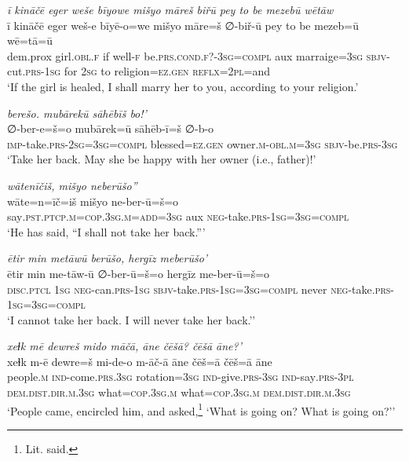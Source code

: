 \ea \label{ZP.100}
\textit{ī kināčē eger weše bīyowe mišyo māreš biřū pey to be mezebū wētāw} \\ 
\gll ī kināčē eger weš-e bīyē-o=we mišyo māre=š ∅-biř-ū pey to be mezeb=ū wē=tā=ū \\ 
 dem.prox girl\textsc{.obl}\textsc{.f} if well\textsc{-f} be\textsc{.prs}.\textsc{cond}\textsc{.f}?\textsc{-3sg}\textsc{=compl} aux marraige\textsc{=3sg} \textsc{sbjv-}cut\textsc{.prs}\textsc{-\textsc{1sg}} for \textsc{2sg} to religion\textsc{\textsc{=ez.gen}} \textsc{reflx}=\textsc{2pl}=and \\ 
\glt `If the girl is healed, I shall marry her to you, according to your religion.'
\z 
 
\ea \label{ZP.106}
\textit{berešo. mubārekū sāhēbīš bo!’} \\ 
\gll ∅-ber-e=š=o mubārek=ū sāhēb-ī=š ∅-b-o \\ 
 \textsc{imp-}take\textsc{.prs}-\textsc{2sg}\textsc{=3sg}\textsc{=compl} blessed\textsc{\textsc{=ez.gen}} owner\textsc{.m}\textsc{-obl}\textsc{.m}\textsc{=3sg} \textsc{sbjv-}be\textsc{.prs}\textsc{-3sg} \\ 
\glt `Take her back. May she be happy with her owner (i.e., father)!'
\z 
 
\ea \label{ZP.108}
\textit{wātenīčiš, mišyo neberūšo”} \\ 
\gll wāte=n=īč=iš mišyo ne-ber-ū=š=o \\ 
 say\textsc{.pst}\textsc{.ptcp}\textsc{.m}\textsc{=cop}\textsc{.3sg}\textsc{.m}\textsc{=add}\textsc{=3sg} aux \textsc{neg-}take\textsc{.prs}\textsc{-\textsc{1sg}}\textsc{=3sg}\textsc{=compl} \\ 
\glt `He has said, “I shall not take her back.”'
\z 
 
\ea \label{ZP.109}
\textit{ētir min metāwū berūšo, hergīz meberūšo’} \\ 
\gll ētir min me-tāw-ū ∅-ber-ū=š=o hergīz me-ber-ū=š=o \\ 
 \textsc{disc.ptcl} \textsc{1sg} \textsc{neg-}can\textsc{.prs}\textsc{-\textsc{1sg}} \textsc{sbjv-}take\textsc{.prs}\textsc{-\textsc{1sg}}\textsc{=3sg}\textsc{=compl} never \textsc{neg-}take\textsc{.prs}\textsc{-\textsc{1sg}}\textsc{=3sg}\textsc{=compl} \\ 
\glt `I cannot take her back. I will never take her back.’'
\z 
 
\ea \label{ZP.113}
\textit{xeɫk mē dewreš mido māčā, āne čēšā? čēšā āne?’} \\ 
\gll xeɫk m-ē dewre=š mi-de-o m-āč-ā āne čēš=ā čēš=ā āne \\ 
 people\textsc{.m} \textsc{ind-}come\textsc{.prs}\textsc{.3sg} rotation\textsc{=3sg} \textsc{ind-}give\textsc{.prs}\textsc{-3sg} \textsc{ind-}say\textsc{.prs}\textsc{-3pl} \textsc{dem.dist}\textsc{.dir}\textsc{.m}\textsc{.3sg} what\textsc{=cop}\textsc{.3sg}\textsc{.m} what\textsc{=cop}\textsc{.3sg}\textsc{.m} \textsc{dem.dist}\textsc{.dir}\textsc{.m}\textsc{.3sg} \\ 
\glt `People came, encircled him, and asked,\footnote{Lit. said.} ‘What is going on? What is going on?’'
\z 
 
